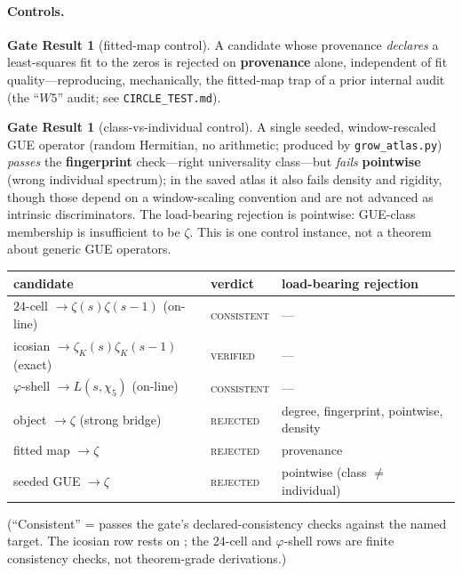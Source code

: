 \documentclass[11pt]{article}
\theoremstyle{definition}
\newtheorem{result}[theorem]{Gate Result}
\newcommand{\zetaK}{\zeta_{K}}
\begin{document}
\paragraph{Controls.}
\begin{result}[fitted-map control]\label{res:fit}
A candidate whose provenance \emph{declares} a least-squares fit to the zeros is rejected
on \textbf{provenance} alone, independent of fit quality---reproducing, mechanically, the
fitted-map trap of a prior internal audit (the ``$W5$'' audit; see
\texttt{CIRCLE\_TEST.md}).
\end{result}
\begin{result}[class-vs-individual control]\label{res:gue}
A single seeded, window-rescaled GUE operator (random Hermitian, no arithmetic; produced
by \texttt{grow\_atlas.py}) \emph{passes} the \textbf{fingerprint} check---right
universality class---but \emph{fails} \textbf{pointwise} (wrong individual spectrum); in
the saved atlas it also fails density and rigidity, though those depend on a window-scaling
convention and are not advanced as intrinsic discriminators. The load-bearing rejection is
pointwise: GUE-class membership is insufficient to be $\zeta$. This is one control instance,
not a theorem about generic GUE operators.
\end{result}

\begin{center}\small
\begin{tabular}{llp{4.2cm}}
\hline
candidate & verdict & load-bearing rejection \\
\hline
$24$-cell $\to \zeta(s)\zeta(s-1)$ (on-line) & \textsc{consistent} & --- \\
icosian $\to \zetaK(s)\zetaK(s-1)$ (exact) & \textsc{verified} & --- \\
$\varphi$-shell $\to L(s,\chi_5)$ (on-line) & \textsc{consistent} & --- \\
object $\to \zeta$ (strong bridge) & \textsc{rejected} & degree, fingerprint, pointwise, density \\
fitted map $\to \zeta$ & \textsc{rejected} & provenance \\
seeded GUE $\to \zeta$ & \textsc{rejected} & pointwise (class $\ne$ individual) \\
\hline
\end{tabular}
\end{center}
\noindent (``Consistent'' = passes the gate's declared-consistency checks against the
named target. The icosian row rests on \cite{IcosianTriad}; the $24$-cell and
$\varphi$-shell rows are finite consistency checks, not theorem-grade derivations.)
\end{document}
